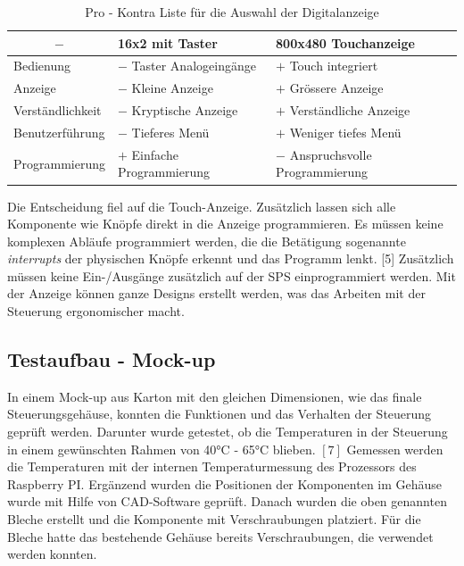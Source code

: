 \begin{table}[H]
    \centering
    \begin{tabular}{l|l|l}
        \multicolumn{1}{c|}{$-$}&        \textbf{16x2 mit Taster}&       \textbf{800x480 Touchanzeige}\\
        \hline
        Bedienung&                      $-$ Taster Analogeingänge&      $+$ Touch integriert\\
        Anzeige&                        $-$ Kleine Anzeige&             $+$ Grössere Anzeige\\
        Verständlichkeit&               $-$ Kryptische Anzeige&         $+$ Verständliche Anzeige\\
        Benutzerführung&                 $-$ Tieferes Menü&              $+$ Weniger tiefes Menü\\
        Programmierung&                 $+$ Einfache Programmierung&    $-$ Anspruchsvolle Programmierung
    \end{tabular}
    \caption{Pro - Kontra Liste für die Auswahl der Digitalanzeige}
    \label{tab:choice_display_hw}
\end{table}

Die Entscheidung fiel auf die Touch-Anzeige. Zusätzlich lassen sich alle Komponente wie Knöpfe direkt in die Anzeige programmieren. Es müssen keine komplexen Abläufe programmiert werden, die die Betätigung sogenannte \textit{interrupts} der physischen Knöpfe erkennt und das Programm lenkt. [5] Zusätzlich müssen keine Ein-/Ausgänge zusätzlich auf der SPS einprogrammiert werden. Mit der Anzeige können ganze Designs erstellt werden, was das Arbeiten mit der Steuerung ergonomischer macht.

\subsection{Testaufbau - Mock-up}
In einem Mock-up aus Karton mit den gleichen Dimensionen, wie das finale Steuerungsgehäuse, konnten die Funktionen und das Verhalten der Steuerung geprüft werden. Darunter wurde getestet, ob die Temperaturen in der Steuerung in einem gewünschten Rahmen von 40°C - 65°C blieben. $[7]$ Gemessen werden die Temperaturen mit der internen Temperaturmessung des Prozessors des Raspberry PI. Ergänzend wurden die Positionen der Komponenten im Gehäuse wurde mit Hilfe von CAD-Software geprüft. Danach wurden die oben genannten Bleche erstellt und die Komponente mit Verschraubungen platziert. Für die Bleche hatte das bestehende Gehäuse bereits Verschraubungen, die verwendet werden konnten.


